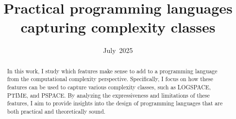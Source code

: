 \documentclass[en]  {pracamgr}
\title{Practical programming languages capturing complexity classes}
\date{July~2025}
\theoremstyle{plain}
\theoremstyle{definition}
\theoremstyle{definition}
\theoremstyle{plain}
\theoremstyle{remark}
\begin{document}
\hypersetup{pageanchor=false}
\maketitle

\begin{abstract}
    In this work, I study which features make sense to add to a programming language
    from the computational complexity perspective. Specifically, 
    I focus on how these features can be used to capture various complexity classes, 
    such as LOGSPACE, PTIME, and PSPACE\@. By analyzing the expressiveness and limitations 
    of these features, I aim to provide insights into the design of programming languages
     that are both practical and theoretically sound.
\end{abstract}

\hypersetup{pageanchor=true}
\tableofcontents




\printbibliography[heading=bibintoc]

\end{document}
